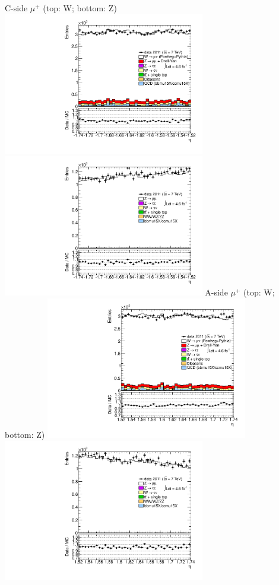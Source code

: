  {
\colb[T]
C-side $\mu^{+}$ (top: W; bottom: Z)
\centering
\includegraphics[width=0.66\textwidth]{dates/20130306/figures/etaphi/WpDtoH_8_C_stack_l_eta_POS} \\
\includegraphics[width=0.66\textwidth]{dates/20130306/figures/etaphi/Z_8_C_stack_lP_eta_ALL.pdf}
A-side $\mu^{+}$ (top: W; bottom: Z)
\centering
\includegraphics[width=0.66\textwidth]{dates/20130306/figures/etaphi/WpDtoH_8_A_stack_l_eta_POS} \\
\includegraphics[width=0.66\textwidth]{dates/20130306/figures/etaphi/Z_8_A_stack_lP_eta_ALL.pdf} 
\cole
}
